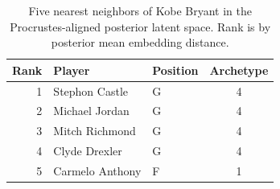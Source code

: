 \begin{table}[htbp]
  \centering\small
  \begin{tabular}{rllc}
    \toprule
    Rank & Player & Position & Archetype \\
    \midrule
    1 & Stephon Castle & G & 4 \\
    2 & Michael Jordan & G & 4 \\
    3 & Mitch Richmond & G & 4 \\
    4 & Clyde Drexler & G & 4 \\
    5 & Carmelo Anthony & F & 1 \\
    \bottomrule
  \end{tabular}
  \caption{Five nearest neighbors of Kobe Bryant in the Procrustes-aligned posterior latent space. Rank is by posterior mean embedding distance.}
  \label{tab:Kobe_Bryant_neighbors}
\end{table}

